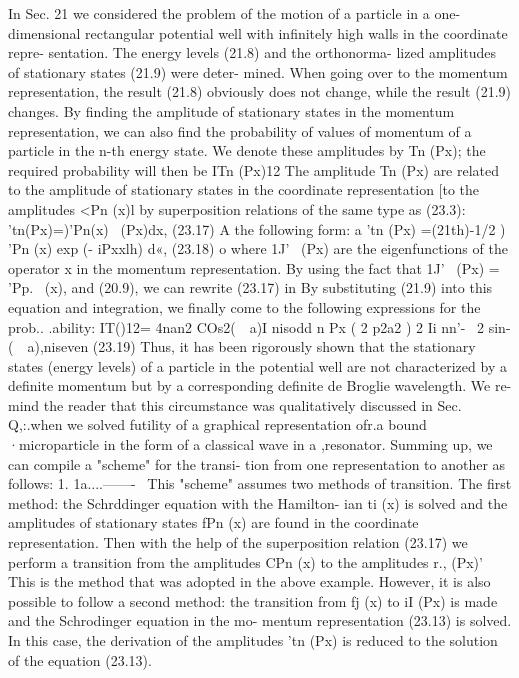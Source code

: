\documentclass[a4paper,sfsidenotes,colorlinks=true]{tufte-book}
\numberwithin{equation}{section}
\numberwithin{figure}{section}
\begin{document}
{{{{In Sec. 21 we considered the problem of the motion of a particle in a one-dimensional rectangular potential well with infinitely high walls in the coordinate repre- sentation. The energy levels (21.8) and the orthonorma- lized amplitudes of stationary states (21.9) were deter- mined. When going over to the momentum representation, the result (21.8) obviously does not change, while the result (21.9) changes. By finding the amplitude of stationary states in the momentum representation, we can also find the probability of values of momentum of a particle in the n-th energy state. We denote these amplitudes by Tn (Px); the required probability will then be ITn (Px)12 The amplitude Tn (Px) are related to the amplitude of stationary states in the coordinate representation [to the amplitudes <Pn (x)l by superposition relations of the same type as (23.3):
'tn(Px)=)'Pn(x) ~(Px)dx,	(23.17) A
the following form:
a
'tn (Px) =(21th)-1/2	)	'Pn (x) exp (-	iPxxlh) d«,	(23.18) o
where 1J'~ (Px) are the eigenfunctions of the operator x in the momentum representation. By using the fact that 1J'~ (Px) = 'Pp.~ (x), and (20.9), we can rewrite (23.17) in
By substituting (21.9) into this equation and integration, we finally come to the following expressions for the prob.. .ability:
IT()12=	4nan2	{ COs2(~~a)I nisodd n Px	( 2	p2a2 ) 2
Ii nn'-	~2	sin-(~~a),niseven (23.19)
Thus, it has been rigorously shown that the stationary states (energy levels) of a particle in the potential well are not characterized by a definite momentum but by a corresponding definite de Broglie wavelength. We re- mind the reader that this circumstance was qualitatively discussed in Sec. Q,:.when we solved futility of a graphical representation ofr.a bound ·microparticle in the form of a
classical wave in a ,resonator. Summing up, we can compile a "scheme" for the transi-
tion from one representation to another as follows:
1.
1a....-------~
This "scheme" assumes two methods of transition. The first method: the Schrddinger equation with the Hamilton-
ian ti (x) is solved and the amplitudes of stationary states fPn (x) are found in the coordinate representation. Then with the help of the superposition relation (23.17) we perform a transition from the amplitudes CPn (x) to the amplitudes r., (Px)' This is the method that was adopted in the above example. However, it is also possible to
follow a second method: the transition from fj (x) to
iI (Px) is made and the Schrodinger equation in the mo- mentum representation (23.13) is solved. In this case, the derivation of the amplitudes 'tn (Px) is reduced to the solution of the equation (23.13).
}}}}}
\end{document}
